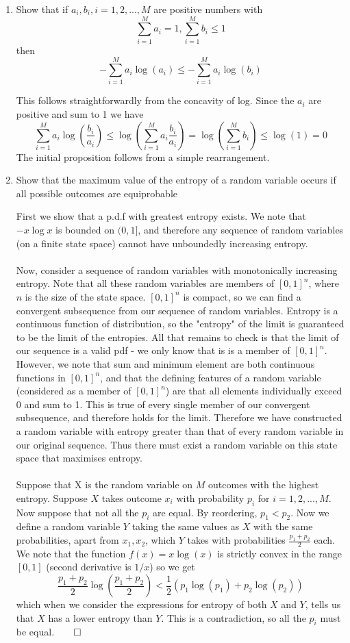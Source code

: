 \documentclass{article}
\newcommand{\chapternumber}{2}
\newenvironment{QandA}{\begin{enumerate}[label=\chapternumber.\arabic*]\bfseries\boldmath}
	{\end{enumerate}}
\newenvironment{answered}{\par\bigskip\normalfont\unboldmath}{}
\begin{document}
\begin{QandA}
	\item Show that if $a_i,b_i,i=1,2,...,M$ are positive numbers with
	\[\sum_{i=1}^Ma_i=1,\sum_{i=1}^Mb_i\leq1\]
	then
	\[-\sum_{i=1}^Ma_i\log(a_i)\leq-\sum_{i=1}^Ma_i\log(b_i)\]
	\begin{answered}
		This follows straightforwardly from the concavity of log. Since the $a_i$ are positive and sum to 1 we have
	\[\sum_{i=1}^Ma_i\log\left(\frac{b_i}{a_i}\right)\leq \log\left(\sum_{i=1}^Ma_i\frac{b_i}{a_i}\right)=\log\left(\sum_{i=1}^Mb_i\right)\leq \log(1)=0\]
	The initial proposition follows from a simple rearrangement.
	\end{answered}


	\item Show that the maximum value of the entropy of a random variable occurs if all possible outcomes are equiprobable
	\begin{answered}
		First we show that a p.d.f with greatest entropy exists. We note that $-x\log x$ is bounded on $(0,1]$, and therefore any sequence of random variables (on a finite state space) cannot have unboundedly increasing entropy.\\
		\\
		Now, consider a sequence of random variables with monotonically increasing entropy. Note that all these random variables are members of $[0,1]^n$, where $n$ is the size of the state space. $[0,1]^n$ is compact, so we can find a convergent subsequence from our sequence of random variables. Entropy is a continuous function of distribution, so the "entropy" of the limit is guaranteed to be the limit of the entropies. All that remains to check is that the limit of our sequence is a valid pdf - we only know that is is a member of $[0,1]^n$. However, we note that sum and minimum element are both continuous functions in $[0,1]^n$, and that the defining features of a random variable (considered as a member of $[0,1]^n$) are that all elements individually exceed 0 and sum to 1. This is true of every single member of our convergent subsequence, and therefore holds for the limit. Therefore we have constructed a random variable with entropy greater than that of every random variable in our original sequence. Thus there must exist a random variable on this state space that maximises entropy.\\
		\\
		Suppose that X is the random variable on $M$ outcomes with the highest entropy. Suppose $X$ takes outcome $x_i$ with probability $p_i$ for $i=1,2,...,M$. Now suppose that not all the $p_i$ are equal. By reordering, $p_1< p_2$. Now we define a random variable $Y$ taking the same values as $X$ with the same probabilities, apart from $x_1,x_2$, which $Y$ takes with probabilities $\frac{p_1+p_2}{2}$ each. We note that the function $f(x)=x\log(x)$ is strictly convex in the range $[0,1]$ (second derivative is $1/x$) so we get
		\[\frac{p_1+p_2}{2}\log\left(\frac{p_1+p_2}{2}\right)<\frac{1}{2}(p_1\log(p_1)+p_2\log(p_2))\]
		which when we consider the expressions for entropy of both $X$ and $Y$, tells us that $X$ has a lower entropy than $Y$. This is a contradiction, so all the $p_i$ must be equal.$\qed$
		

\end{answered}
\end{QandA}
\end{document}
